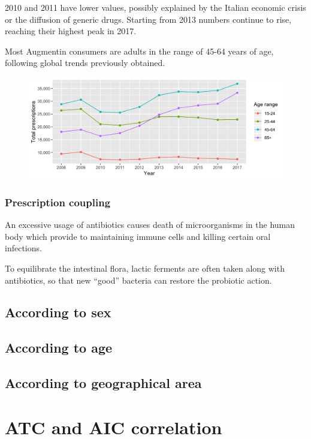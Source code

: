 2010 and 2011 have lower values, possibly explained by the Italian economic crisis or the diffusion of generic drugs. Starting from 2013 numbers continue to rise, reaching their highest peak in 2017.

Most Augmentin consumers are adults in the range of 45-64 years of age, following global trends previously obtained.

\begin{figure}[h]
	\centering
	\includegraphics[scale=0.3]{../plots/augmentin_age-year.png}
\end{figure}

\newpage
\subsubsection{Prescription coupling}
An excessive usage of antibiotics causes death of microorganisms in the human body which provide to maintaining immune cells and killing certain oral infections\cite{bacteria}.

To equilibrate the intestinal flora, lactic ferments are often taken along with antibiotics, so that new ``good'' bacteria can restore the probiotic action.



\subsection{According to sex} %

\subsection{According to age}

\subsection{According to geographical area}

\section[ATC-AIC]{ATC and AIC correlation}

